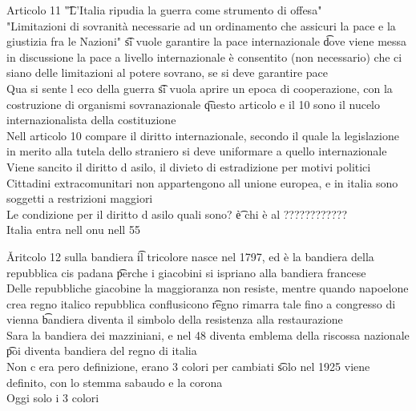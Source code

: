 \documentclass[12pt]{article}
\begin{document}
Articolo 11 \t "L'Italia ripudia la guerra come strumento di offesa" \\
"Limitazioni di sovranità necessarie ad un ordinamento che assicuri la pace e la giustizia fra le Nazioni" \t si vuole garantire la pace internazionale \t dove viene messa in discussione la pace a livello internazionale è consentito (non necessario) che ci siano delle limitazioni al potere sovrano, se si deve garantire pace \\
Qua si sente l eco della guerra \t si vuola aprire un epoca di cooperazione, con la costruzione di organismi sovranazionale \t questo articolo e il 10 sono il nucelo internazionalista della costituzione \\
Nell articolo 10 compare il diritto internazionale, secondo il quale la legislazione in merito alla tutela dello straniero si deve uniformare a quello internazionale \\
Viene sancito il diritto d asilo, il divieto di estradizione per motivi politici \\
Cittadini extracomunitari non appartengono all unione europea, e in italia sono soggetti a restrizioni maggiori \\
Le condizione per il diritto d asilo quali sono? \t è chi è al ???????????? \\
Italia entra nell onu nell 55

\v

Aritcolo 12 sulla bandiera \t il tricolore nasce nel 1797, ed è la bandiera della repubblica cis padana \t perche i giacobini si ispriano alla bandiera francese \\
Delle repubbliche giacobine la maggioranza non resiste, mentre quando napoelone crea regno italico repubblica conflusicono \t regno rimarra tale fino a congresso di vienna \t bandiera diventa il simbolo della resistenza alla restaurazione \\
Sara la bandiera dei mazziniani, e nel 48 diventa emblema della riscossa nazionale \t poi diventa bandiera del regno di italia \\
Non c era pero definizione, erano 3 colori per cambiati \t solo nel 1925 viene definito, con lo stemma sabaudo e la corona \\
Oggi solo i 3 colori
\end{document}
